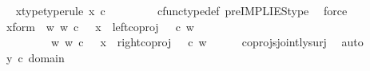 \begin{isabellebody}
\ \isamarkupfalse%
\ x{\isacharunderscore}{\kern0pt}type{\isacharbrackleft}{\kern0pt}type{\isacharunderscore}{\kern0pt}rule{\isacharbrackright}{\kern0pt}{\isacharcolon}{\kern0pt}\ {\isachardoublequoteopen}x\ {\isasymin}\isactrlsub c\ {\isacharparenleft}{\kern0pt}{\isasymone}{\isasymCoprod}{\isacharparenleft}{\kern0pt}{\isasymone}{\isasymCoprod}{\isasymone}{\isacharparenright}{\kern0pt}{\isacharparenright}{\kern0pt}{\isachardoublequoteclose}\ \ \isanewline
\ \ \ \ \isamarkupfalse%
\ cfunc{\isacharunderscore}{\kern0pt}type{\isacharunderscore}{\kern0pt}def\ pre{\isacharunderscore}{\kern0pt}IMPLIES{\isacharunderscore}{\kern0pt}type\ \isamarkupfalse%
\ force\isanewline
\ \ \isamarkupfalse%
\ \isamarkupfalse%
\ x{\isacharunderscore}{\kern0pt}form{\isacharcolon}{\kern0pt}\ {\isachardoublequoteopen}{\isacharparenleft}{\kern0pt}{\isasymexists}\ w{\isachardot}{\kern0pt}\ {\isacharparenleft}{\kern0pt}w\ {\isasymin}\isactrlsub c\ {\isasymone}\ {\isasymand}\ x\ {\isacharequal}{\kern0pt}\ {\isacharparenleft}{\kern0pt}left{\isacharunderscore}{\kern0pt}coproj\ {\isasymone}\ {\isacharparenleft}{\kern0pt}{\isasymone}{\isasymCoprod}{\isasymone}{\isacharparenright}{\kern0pt}{\isacharparenright}{\kern0pt}\ {\isasymcirc}\isactrlsub c\ w{\isacharparenright}{\kern0pt}{\isacharparenright}{\kern0pt}\isanewline
\ \ \ \ \ \ {\isasymor}\ \ {\isacharparenleft}{\kern0pt}{\isasymexists}\ w{\isachardot}{\kern0pt}\ {\isacharparenleft}{\kern0pt}w\ {\isasymin}\isactrlsub c\ {\isacharparenleft}{\kern0pt}{\isasymone}{\isasymCoprod}{\isasymone}{\isacharparenright}{\kern0pt}\ {\isasymand}\ x\ {\isacharequal}{\kern0pt}\ {\isacharparenleft}{\kern0pt}right{\isacharunderscore}{\kern0pt}coproj\ {\isasymone}\ {\isacharparenleft}{\kern0pt}{\isasymone}{\isasymCoprod}{\isasymone}{\isacharparenright}{\kern0pt}{\isacharparenright}{\kern0pt}\ {\isasymcirc}\isactrlsub c\ w{\isacharparenright}{\kern0pt}{\isacharparenright}{\kern0pt}{\isachardoublequoteclose}\isanewline
\ \ \ \ \isamarkupfalse%
\ coprojs{\isacharunderscore}{\kern0pt}jointly{\isacharunderscore}{\kern0pt}surj\ \isamarkupfalse%
\ auto\isanewline
\isanewline
\ \ \isamarkupfalse%
\ {\isachardoublequoteopen}y\ {\isasymin}\isactrlsub c\ domain\ {\isacharparenleft}{\kern0pt}{\isasymlangle}{\isasymt}{\isacharcomma}{\kern0pt}{\isasymt}{\isasymrangle}\ {\isasymamalg}\ {\isasymlangle}{\isasymf}{\isacharcomma}{\kern0pt}\ {\isasymf}{\isasymrangle}\ {\isasymamalg}\ {\isasymlangle}{\isasymf}{\isacharcomma}{\kern0pt}{\isasymt}{\isasymrangle}{\isacharparenright}{\kern0pt}{\isachardoublequoteclose}\ \isanewline

\end{isabellebody}
